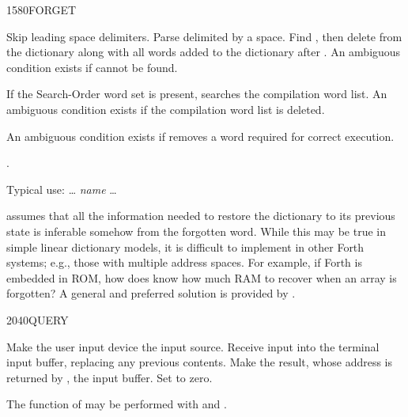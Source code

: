 \begin{worddef}{1580}{FORGET}
\item {}

	Skip leading space delimiters. Parse  delimited by a
	space. Find , then delete  from the
	dictionary along with all words added to the dictionary after
	. An ambiguous condition exists if  cannot
	be found.

	If the Search-Order word set is present,  searches
	the compilation word list. An ambiguous condition exists if the
	compilation word list is deleted.

	An ambiguous condition exists if  removes a word
	required for correct execution.

\see {}.

	\begin{rationale} %
		Typical use:
			{\ldots}  \emph{name} {\ldots}

		 assumes that all the information needed to
		restore the dictionary to its previous state is inferable
		somehow from the forgotten word. While this may be true in
		simple linear dictionary models, it is difficult to implement
		in other Forth systems; e.g., those with multiple address
		spaces. For example, if Forth is embedded in ROM, how does
		 know how much RAM to recover when an array
		is forgotten? A general and preferred solution is provided by
		.
	\end{rationale}
\end{worddef}


\begin{worddef}{2040}{QUERY}
\item \stack{}{}

	Make the user input device the input source. Receive input into
	the terminal input buffer, replacing any previous contents. Make
	the result, whose address is returned by , the input
	buffer. Set  to zero.

\note

	\begin{rationale} %
		The function of  may be performed with 
		and .
	\end{rationale}
\end{worddef}


